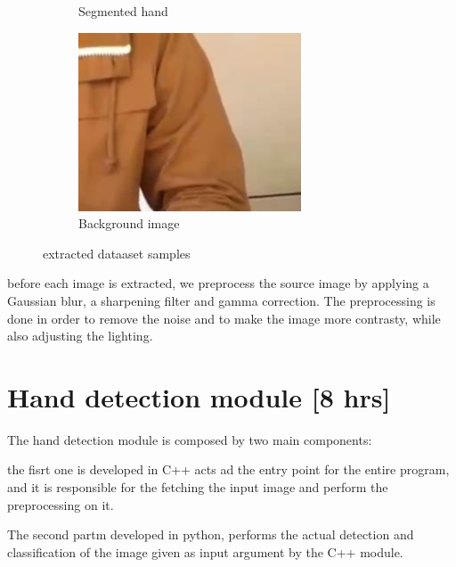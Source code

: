 \begin{figure}
\begin{subfigure}[b]{0.3\textwidth}
        \caption{Segmented hand}
        \label{fig:three sin x}
    \end{subfigure}
    \hfill
    \begin{subfigure}[b]{0.3\textwidth}
        \centering
        \includegraphics[width=\textwidth]{images/notHand/133.jpg}
        \caption{Background image}
        \label{fig:five over x}
    \end{subfigure}
       \caption{extracted dataaset samples}
       \label{fig:three graphs}
\end{figure}

before each image is extracted, we preprocess the source image by applying a Gaussian blur, a sharpening filter and gamma correction. The preprocessing is done in order to remove
the noise and to make the image more contrasty, while also adjusting the lighting.

\section{Hand detection module [8 hrs]}
The hand detection module is composed by two main components: 

the fisrt one is developed in C++ acts ad the entry point for the entire program, and it is responsible for the 
fetching the input image and perform the preprocessing on it.

The second partm developed in python, performs the actual detection and classification of the image given as input argument 
by the C++ module. 

